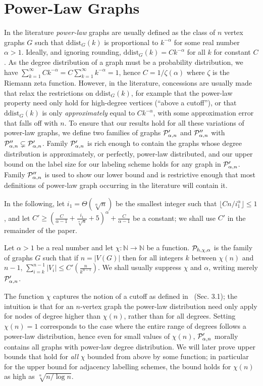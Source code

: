
 \section{Power-Law Graphs}\label{Sec:GraphFamilies}

In the literature \emph{power-law} graphs are usually defined as the class of $n$ vertex graphs $G$ such that $\mathrm{ddist}_G(k)$
is proportional to $k^{-\alpha}$ for some real number $\alpha > 1$. Ideally, and ignoring rounding,  $\mathrm{ddist}_G(k) = Ck^{-\alpha}$ for all $k$ for constant $C$. As the degree distribution of a graph must be a probability distribution, we have $\sum_{k=1}^\infty C k^{-\alpha} = C \sum_{k=1}^\infty k^{-\alpha} = 1$, hence  $C = 1/\zeta(\alpha)$ where $\zeta$ is the Riemann zeta function. However, in the literature, concessions are usually made that relax
the restrictions on $\mathrm{ddist}_G(k)$, for example that the power-law property need only hold for high-degree
vertices (``above a cutoff''), or that $\mathrm{ddist}_G(k)$ is only \emph{approximately} equal to $Ck^{-\alpha}$,
with some approximation error that falls off with $n$.
To ensure that our results hold for all these variations of power-law graphs, 
 we define two families of graphs $ \mathcal{P}'_{\alpha,n}$ and $ \mathcal{P}''_{\alpha,n}$ with $ \mathcal{P}''_{\alpha,n}\subsetneq \mathcal{P}'_{\alpha,n}$. Family $ \mathcal{P}'_{\alpha,n}$ is rich enough to contain the graphs whose degree distribution is approximately, or perfectly, power-law distributed, and our upper bound on the label size for our labeling scheme holds for any graph in $ \mathcal{P}'_{\alpha,n}$. Family $ \mathcal{P}''_{\alpha,n}$ is used to show our lower bound
 and is restrictive enough that most definitions of power-law graph occurring in the literature will contain it. 
 
In the following, let $i_1 = \Theta(\sqrt[\alpha]n)$ be the smallest integer such that $\lfloor Cn/i_1^\alpha\rfloor \leq 1$, and let $C'\geq(\frac C{\alpha-1} + \frac{i_1}{\sqrt[\alpha] n} + 5)^{\alpha} + \frac{C}{\alpha - 1}$ be a constant; we shall use $C'$ in the remainder of the paper.
\begin{definition} \label{def:general-family}
Let $\alpha > 1$ be a real number and let $\chi:\mathbb N\rightarrow\mathbb N$ be a function. $ \mathcal{P}_{h,\chi,\alpha}$ is the family of graphs $G$ such that if $n = \vert V(G)\vert$ then for all integers $k$ between $\chi(n)$ and $n-1$, $\sum_{i = k}^{n-1} {\vert V_i\vert} \leq C'(\frac{n}{k^{\alpha-1}})$. We shall usually suppress $\chi$ and $\alpha$, writing merely $ \mathcal{P}'_{\alpha,n}$.
\end{definition}
The function $\chi$ captures the notion of a cutoff as defined in~\cite{clauset2009power} (Sec. 3.1); the intuition is  that for an $n$-vertex graph the power-law distribution need only apply for nodes of degree higher than $\chi(n)$, rather than for all degrees. 
Setting $\chi(n) = 1$ corresponds to the case where the entire range of degrees follows a power-law distribution, hence
even for small values of $\chi(n)$, $ \mathcal{P}'_{\alpha,n}$ morally contains all graphs with power-law degree distribution.
We will later prove upper bounds that hold for \emph{all} $\chi$ bounded from above by some function; in particular
for the upper bound for adjacency labelling schemes, the bound holds for $\chi(n)$ as high as  $\sqrt[\alpha]{n/\log n}$.

